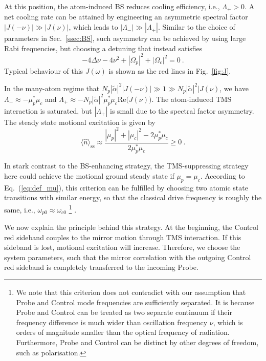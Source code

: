 \documentclass[aps, pra, reprint, amsmath, amssymb, groupedaddress, acknowledgments]{revtex4-1}
\begin{document}
At this position, the atom-induced BS reduces cooling efficiency, i.e., $\Lambda_+>0$.  A net cooling rate can be attained by engineering an asymmetric spectral factor $|J(-\nu)| \gg |J(\nu)|$, which leads to $|\Lambda_-|\gg |\Lambda_+|$.  Similar to the choice of parameters in Sec.~\ref{ssec:BS}, such asymmetry can be achieved by using large Rabi frequencies, but choosing a detuning that instead satisfies
\begin{equation}\label{eq:red_detune}
-4\Delta \nu - 4 \nu^2 +  |\Omega_p|^2+|\Omega_c|^2 =0~.
\end{equation}
Typical behaviour of this $J(\omega)$ is shown as the red lines in Fig.~\ref{fig:J}.

In the many-atom regime that $N_p |\tilde{\alpha}|^2 |J(-\nu)| \gg 1 \gg N_p |\tilde{\alpha}|^2 |J(\nu)$, we have
$ \Lambda_- \approx -\mu_p^\ast \mu_c$ and $\Lambda_+ \approx -N_p |\tilde{\alpha}|^2 \mu_p^\ast \mu_c \textrm{Re}\big(J(\nu)\big)$.  The atom-induced TMS interaction is saturated, but $|\Lambda_+|$ is small due to the spectral factor asymmetry.  The steady state motional excitation is given by
\begin{equation}
\langle \hat{n} \rangle_\textrm{ss} \approx \frac{|\mu_p|^2 + |\mu_c|^2 - 2 \mu_p^\ast \mu_c}{2 \mu_p^\ast \mu_c} \geq 0~.
\end{equation}

In stark contrast to the BS-enhancing strategy, the TMS-suppressing strategy here could achieve the motional ground steady state if $\mu_p=\mu_c$.  According to Eq.~(\ref{eq:def_mu}), this criterion can be fulfilled by choosing two atomic state transitions with similar energy, so that the classical drive frequency is roughly the same, i.e., $\omega_{p0} \approx \omega_{c0}$  
\footnote{We note that this criterion does not contradict with our assumption that Probe and Control mode frequencies are sufficiently separated.  It is because Probe and Control can be treated as two separate continuum if their frequency difference is much wider than oscillation frequency $\nu$, which is orders of magnitude smaller than the optical frequency of radiation.  Furthermore, Probe and Control can be distinct by other degrees of freedom, such as polarisation.} .

We now explain the principle behind this strategy.  At the beginning, the Control red sideband couples to the mirror motion through TMS interaction.  If this sideband is lost, motional excitation will increase.  Therefore, we choose the system parameters, such that the mirror correlation with the outgoing Control red sideband is completely transferred to the incoming Probe.
\end{document}
